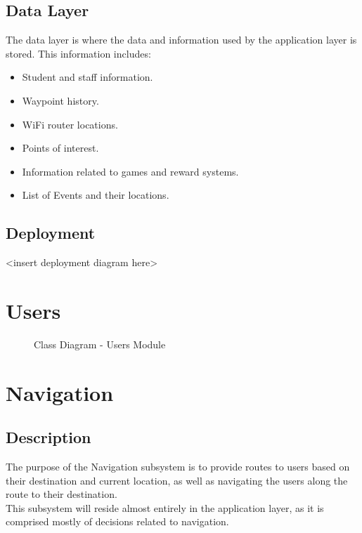 \documentclass[english]{article}
\begin{document}
	    \subsection{Data Layer}
	        The data layer is where the data and information used by the application layer is stored. This information includes:
	        \begin{itemize}
	            \item Student and staff information.
	            \item Waypoint history.
	            \item WiFi router locations.
	            \item Points of interest.
	            \item Information related to games and reward systems.
	            \item List of Events and their locations.

	        \end{itemize}

	   \subsection{Deployment}
	        \textless insert deployment diagram here\textgreater

	\section{Users}
	    \begin{figure}[H]
            \centering	            \centerline{}
            \caption{Class Diagram - Users Module}
        \end{figure}

	\section{Navigation}
        \subsection{Description}
            The purpose of the Navigation subsystem is to provide routes to users based on their destination and current location, as well as navigating the users along the route to their destination.\\
            This subsystem will reside almost entirely in the application layer, as it is comprised mostly of decisions related to navigation.
\end{document}
